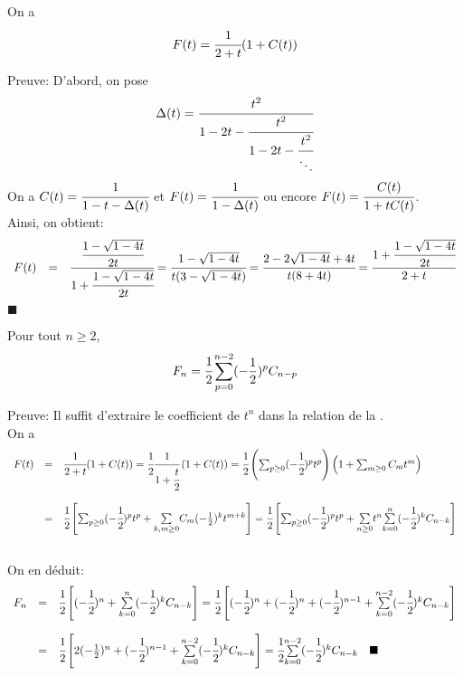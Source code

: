 \begin{proposition} \label{CatFinGenRelation}
	On a \[F(t)=\cfrac{1}{2+t}(1+C(t))\]
\end{proposition}
{Preuve}:
D'abord, on pose \[\Delta(t)=\cfrac{t^2}{1-2t-\cfrac{t^2}{1-2t-\cfrac{t^2}{\ddots}}}\]
On a $C(t)=\cfrac{1}{1-t-\Delta(t)}$ et $F(t)=\cfrac{1}{1-\Delta(t)} $ ou encore $F(t)=\cfrac{C(t)}{1+tC(t)} $. \vspace{5pt}\\
Ainsi, on obtient:
\[
	\begin{array} {c c l}
		F(t) & = & \cfrac{\cfrac{1-\sqrt{1-4t}}{2t}}{1+\cfrac{1-\sqrt{1-4t}}{2t}} =\cfrac{1-\sqrt{1-4t}}{t(3-\sqrt{1-4t})}=\cfrac{2-2\sqrt{1-4t}+4t}{t(8+4t)}=\cfrac{1+\cfrac{1-\sqrt{1-4t}}{2t}}{2+t}
	\end{array}
\]
$\blacksquare$
\begin{proposition}
	Pour tout $n\geq 2$,\[ F_{n}=\cfrac{1}{2}\sum_{p=0}^{n-2}(-\frac{1}{2})^p C_{n-p}\]
\end{proposition}
Preuve:
Il suffit d'extraire le coefficient de $t^{n}$ dans la relation de la
.\\
On a
\[
	\begin{array}{c c l}
		F(t) & =       & \cfrac{1}{2+t}(1+C(t))=\cfrac{1}{2}\cfrac{1}{1+\cfrac{t}{2}}\left(1+C(t)\right)
		=\cfrac{1}{2}\left(\sum_{p\geq 0}(-\cfrac{1}{2})^p t^p\right)\left(1+\sum_{m\geq 0}C_{m}t^m\right)                        \\
		     & \text{} &                                                                                                          \\
		     & =       & \cfrac{1}{2} \left[ \sum_{p\geq 0}(-\cfrac{1}{2})^p t^p + \underset{k,m\geq0}{\sum}C_{m}(-\frac{1}{2})^k
		t^{m+k}\right]=\cfrac{1}{2}\left[\sum_{p\geq 0}(-\cfrac{1}{2})^p t^p +\underset{n\geq0}{\sum}
			t^n\underset{k=0}{\overset{n}{\sum}}(-\cfrac{1}{2})^k C_{n-k}\right]
	\end{array}
\]
\text{}\vspace{5pt}\\
On en déduit:
\[
	\begin{array}{c c l}
		F_{n} & =       & \cfrac{1}{2}\left[(-\cfrac{1}{2})^n + \underset{k=0}{\overset{n}{\sum}}(-\cfrac{1}{2})^k C_{n-k}
			\right]=\cfrac{1}{2}\left[(-\cfrac{1}{2})^n + (-\cfrac{1}{2})^n +(-\cfrac{1}{2})^{n-1} +\underset{k=0}
		{\overset{n-2}{\sum}}(-\cfrac{1}{2})^k C_{n-k}\right]                                                                \\
		      & \text{} &                                                                                                    \\
		      & =       & \cfrac{1}{2}\left[2(-\frac{1}{2})^n + (-\cfrac{1}{2})^{n-1} +\underset{k=0}{\overset{n-2}{\sum}}(-
			\cfrac{1}{2})^k C_{n-k}\right]=\cfrac{1}{2}\underset{k=0}{\overset{n-2}{\sum}}(-\cfrac{1}{2})^k C_{n-k}
		\hspace{10pt}\blacksquare
	\end{array}
\]
